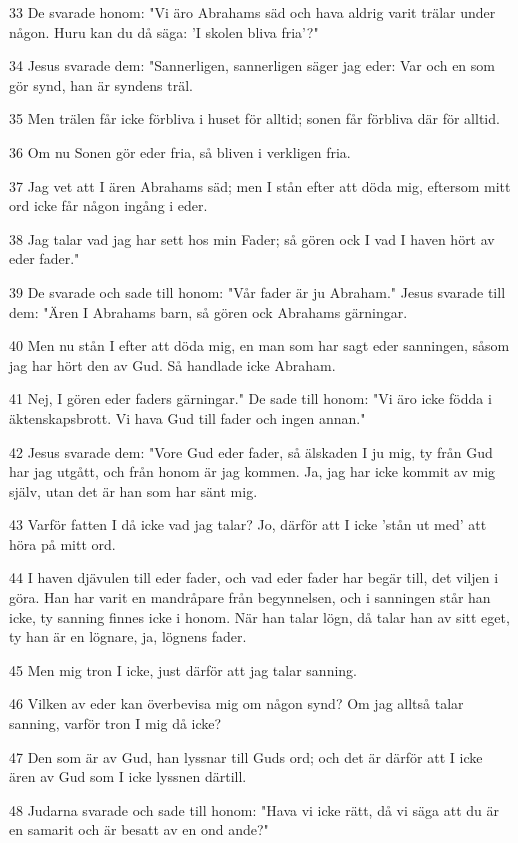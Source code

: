 \par 33 De svarade honom: "Vi äro Abrahams säd och hava aldrig varit trälar under någon. Huru kan du då säga: 'I skolen bliva fria'?"
\par 34 Jesus svarade dem: "Sannerligen, sannerligen säger jag eder: Var och en som gör synd, han är syndens träl.
\par 35 Men trälen får icke förbliva i huset för alltid; sonen får förbliva där för alltid.
\par 36 Om nu Sonen gör eder fria, så bliven i verkligen fria.
\par 37 Jag vet att I ären Abrahams säd; men I stån efter att döda mig, eftersom mitt ord icke får någon ingång i eder.
\par 38 Jag talar vad jag har sett hos min Fader; så gören ock I vad I haven hört av eder fader."
\par 39 De svarade och sade till honom: "Vår fader är ju Abraham." Jesus svarade till dem: "Ären I Abrahams barn, så gören ock Abrahams gärningar.
\par 40 Men nu stån I efter att döda mig, en man som har sagt eder sanningen, såsom jag har hört den av Gud. Så handlade icke Abraham.
\par 41 Nej, I gören eder faders gärningar." De sade till honom: "Vi äro icke födda i äktenskapsbrott. Vi hava Gud till fader och ingen annan."
\par 42 Jesus svarade dem: "Vore Gud eder fader, så älskaden I ju mig, ty från Gud har jag utgått, och från honom är jag kommen. Ja, jag har icke kommit av mig själv, utan det är han som har sänt mig.
\par 43 Varför fatten I då icke vad jag talar? Jo, därför att I icke 'stån ut med' att höra på mitt ord.
\par 44 I haven djävulen till eder fader, och vad eder fader har begär till, det viljen i göra. Han har varit en mandråpare från begynnelsen, och i sanningen står han icke, ty sanning finnes icke i honom. När han talar lögn, då talar han av sitt eget, ty han är en lögnare, ja, lögnens fader.
\par 45 Men mig tron I icke, just därför att jag talar sanning.
\par 46 Vilken av eder kan överbevisa mig om någon synd? Om jag alltså talar sanning, varför tron I mig då icke?
\par 47 Den som är av Gud, han lyssnar till Guds ord; och det är därför att I icke ären av Gud som I icke lyssnen därtill.
\par 48 Judarna svarade och sade till honom: "Hava vi icke rätt, då vi säga att du är en samarit och är besatt av en ond ande?"

